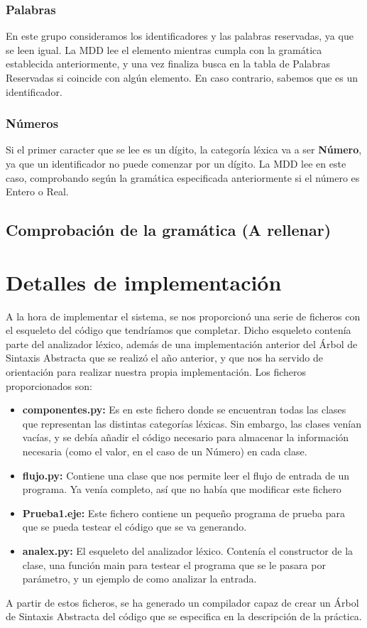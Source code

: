 \documentclass[11pt]{article}
\begin{document}
\subsubsection{Palabras}
En este grupo consideramos los identificadores y las palabras reservadas, ya que se leen igual. La MDD lee el elemento mientras cumpla con la gramática establecida anteriormente, y una vez finaliza busca en la tabla de Palabras Reservadas si coincide con algún elemento. En caso contrario, sabemos que es un identificador. 

\subsubsection{Números}
Si el primer caracter que se lee es un dígito, la categoría léxica va a ser \textbf{Número}, ya que un identificador no puede comenzar por un dígito. La MDD lee en este caso, comprobando según la gramática especificada anteriormente si el número es Entero o Real.

\subsection{Comprobación de la gramática (A rellenar)}


\section{Detalles de implementación}
A la hora de implementar el sistema, se nos proporcionó una serie de ficheros con el esqueleto del código que tendríamos que completar. Dicho esqueleto contenía parte del analizador léxico, además de una implementación anterior del Árbol de Sintaxis Abstracta que se realizó el año anterior, y que nos ha servido de orientación para realizar nuestra propia implementación. Los ficheros proporcionados son: 
\begin{itemize}
	\item \textbf{componentes.py: } Es en este fichero donde se encuentran todas las clases que representan las distintas categorías léxicas. Sin embargo, las clases venían vacías, y se debía añadir el código necesario para almacenar la información necesaria (como el valor, en el caso de un Número) en cada clase.
	\item \textbf{flujo.py: } Contiene una clase que nos permite leer el flujo de entrada de un programa. Ya venía completo, así que no había que modificar este fichero
	\item \textbf{Prueba1.eje: } Este fichero contiene un pequeño programa de prueba para que se pueda testear el código que se va generando. 
	\item \textbf{analex.py: } El esqueleto del analizador léxico. Contenía el constructor de la clase, una función main para testear el programa que se le pasara por parámetro, y un ejemplo de como analizar la entrada.
\end{itemize}
A partir de estos ficheros, se ha generado un compilador capaz de crear un Árbol de Sintaxis Abstracta del código que se especifica en la descripción de la práctica.
\end{document}
